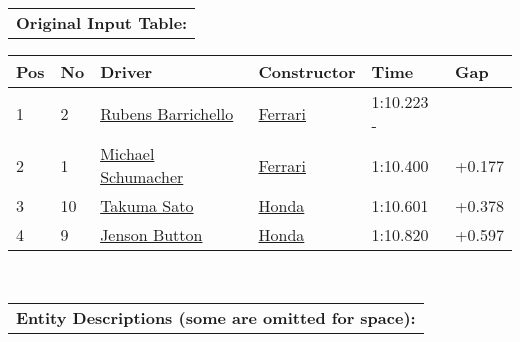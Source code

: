 \documentclass[11pt]{article}
\begin{document}
\begin{figure*}[th]
\begin{tabular}{p{14cm}}
\textbf{Original Input Table:} \\
\end{tabular}
\centering
\small
\begin{tabular}{llllll}
\textbf{Pos} &	\textbf{No} & \textbf{Driver} & \textbf{Constructor} & \textbf{Time} & \textbf{Gap} \\
\hline
1	&2	&\underline{Rubens Barrichello}	&\underline{Ferrari} 	&1:10.223	- \\
2	&1	&\underline{Michael Schumacher}	&\underline{Ferrari}	&1:10.400	&+0.177 \\
3	&10	&\underline{Takuma Sato}	&\underline{Honda}	&1:10.601	&+0.378 \\
4	&9	&\underline{Jenson Button}~	&\underline{Honda}	&1:10.820	&+0.597 \\
\end{tabular}\\
\vspace{6pt}
\begin{tabular}{p{14cm}}
\textbf{Entity Descriptions (some are omitted for space):} \\


\end{tabular}
\end{figure*}
\end{document}
